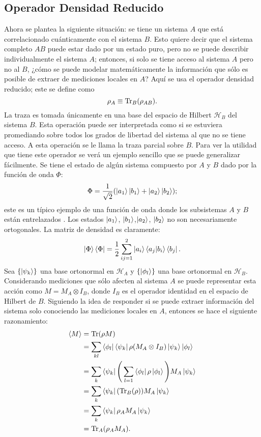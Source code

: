 \subsection{Operador Densidad Reducido}

Ahora se plantea la siguiente situación: se tiene un sistema $A$ que está correlacionado cuánticamente con el sistema $B$. Esto quiere decir que el sistema completo $AB$ puede estar dado por un estado puro, pero no se puede describir individualmente el sistema $A$; entonces, si solo se tiene acceso al sistema $A$ pero no al $B$, ¿cómo se puede modelar matemáticamente la información que sólo es posible de extraer de mediciones locales en $A$? Aquí se usa el operador densidad reducido; este se define como
\begin{equation}
\rho_{A} \equiv \Tr_{B}(\rho_{AB}).
\end{equation}
La traza es tomada únicamente en una base del espacio de Hilbert $\mathcal{H}_{B}$ del sistema $B$. Esta operación puede ser interpretada como si se estuviera promediando sobre todos los grados de libertad del sistema al que no se tiene acceso. A esta operación se le llama la traza parcial sobre $B$. Para ver la utilidad que tiene este operador se verá un ejemplo sencillo que se puede generalizar fácilmente.
Se tiene el estado de algún sistema compuesto por $A$ y $B$ dado por la función de onda $\Phi$:
\begin{equation}
\Phi = \frac{1}{\sqrt{2}} (\ket{a_{1}}\ket{b_{1}}+\ket{a_{2}}\ket{b_{2}});
\end{equation}
este es un típico ejemplo de una función de onda donde los subsistemas $A$ y $B$ están entrelazados \cite{SusskindQuantum}. Los estados $\ket{a_{1}}$, $\ket{b_{1}}$,$\ket{a_{2}}$, $\ket{b_{2}}$ no son necesariamente ortogonales. La matriz de densidad es claramente:
\begin{equation}
\ket{\Phi}\bra{\Phi} = \frac{1}{2}\sum_{ij=1}^{2} \ket{a_{i}}\bra{a_{j}} \ket{b_{i}}\bra{b_{j}} .
\end{equation}
Sea $ \{ \ket{\psi_{k}} \} $ una base ortonormal en $\mathcal{H}_{A}$ y $ \{ \ket{\phi_{l}} \} $ una base ortonormal en $\mathcal{H}_{B}$. Considerando mediciones que sólo afecten al sistema $A$ se puede representar esta acción como $M=M_{A} \otimes I_{B}$, donde $I_{B}$ es el operador identidad en el espacio de Hilbert de $B$. Siguiendo la idea de responder si se puede extraer información del sistema solo conociendo las mediciones locales en $A$, entonces se hace el siguiente razonamiento:
\begin{align}
\langle M \rangle &=  \Tr(\rho M)\\
\quad &=\sum_{kl} \bra{\phi_{l}}\bra{\psi_{k}}\rho(M_{A} \otimes I_{B})\ket{\psi_{k}} \ket{\phi_{l}}\\
\quad &=\sum_{k}\bra{\psi_{k}}  \Bigg( \sum_{l=1} \bra{\phi_{l}} \rho\ket{\phi_{l}} \Bigg) M_{A}\ket{\psi_{k}}\\
\quad &=\sum_{k}\bra{\psi_{k}} ( \Tr_{B}(\rho) )  M_{A}\ket{\psi_{k}}\\
\quad &=\sum_{k}\bra{\psi_{k}} \rho_{A}  M_{A}\ket{\psi_{k}}\\
\quad &= \Tr_{A} (\rho_{A} M_{A}).
\end{align}
